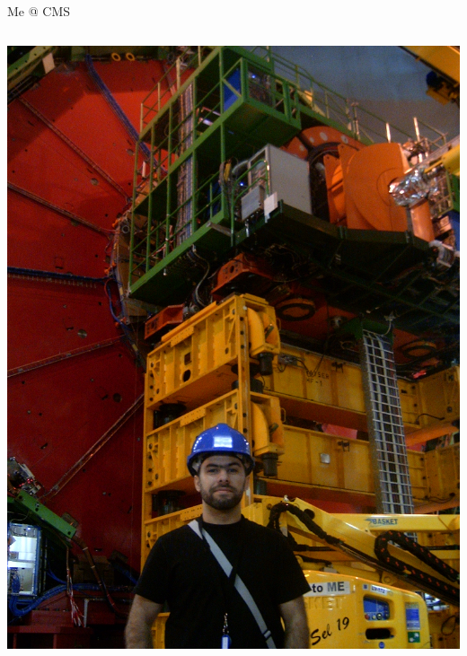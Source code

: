 \documentclass[8pt]{beamer}
\begin{document}
\begin{frame}{Me @ CMS}
\begin{columns}
\begin{block}
    \begin{center}
      \includegraphics[width=1.00\textwidth]{img/MeAtCMS.jpg} 
    \end{center}

  \end{block}

  \end{columns}

\end{frame}
\end{document}
